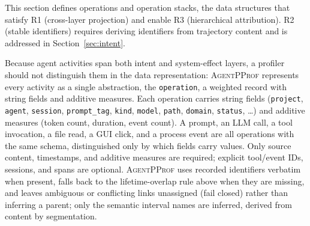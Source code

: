 \documentclass[sigconf,nonacm]{acmart}
\newcommand{\sys}{\textsc{AgentPProf}\xspace}
\newcommand{\operation}{\texttt{operation}\xspace}
\begin{document}
This section defines operations and operation stacks, the data structures that satisfy R1 (cross-layer projection) and enable R3 (hierarchical attribution). R2 (stable identifiers) requires deriving identifiers from trajectory content and is addressed in Section~\ref{sec:intent}.

Because agent activities span both intent and system-effect
layers, a profiler should not distinguish them in the
data representation: \sys represents every activity as a single abstraction, the
\operation, a weighted record with string fields and additive
measures.
Each operation carries string fields (\texttt{project},
\texttt{agent}, \texttt{session}, \texttt{prompt\_tag},
\texttt{kind}, \texttt{model}, \texttt{path}, \texttt{domain},
\texttt{status}, \ldots) and additive measures (token count,
duration, event count).
A prompt, an LLM call, a tool invocation, a file read, a GUI click,
and a process event are all operations with the same schema, distinguished only by which fields carry values.
Only source content, timestamps, and additive measures are required; explicit tool/event IDs, sessions, and spans are optional.
\sys uses recorded identifiers verbatim when present, falls back to the lifetime-overlap rule above when they are missing, and leaves ambiguous or conflicting links unassigned (fail closed) rather than inferring a parent; only the semantic interval names are inferred, derived from content by segmentation.
\end{document}

